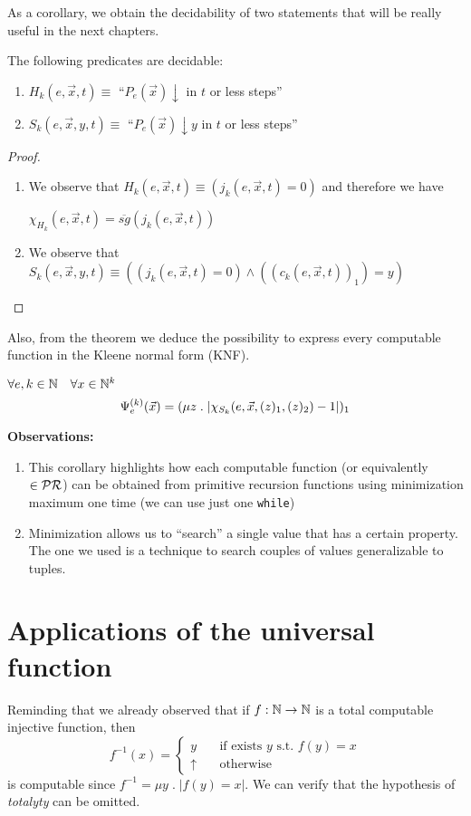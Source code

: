 As a corollary, we obtain the decidability of two statements that will
be really useful in the next chapters.

\begin{corollary}
  The following predicates are decidable:
  \begin{enumerate}[label=(\alph*)]
  \item $H_k(e, \vec{x}, t) \equiv$ ``$P_e(\vec{x})\downarrow$ in $t$
    or less steps''
  \item $S_k(e, \vec{x}, y, t) \equiv$ ``$P_e(\vec{x})\downarrow y$ in
    $t$ or less steps''
  \end{enumerate}
  \begin{proof}
    \begin{enumerate}[label=(\alph*)]
    \item We observe that
      $H_k(e, \vec{x}, t) \equiv (j_k(e,\vec{x}, t) = 0)$ and therefore
      we have

      $\chi_{H_k}(e, \vec{x}, t) = \overline{sg}(j_k(e,\vec{x},t))$
    \item We observe that
      $S_k(e, \vec{x}, y, t) \equiv ((j_k(e,\vec{x},t) = 0) \wedge ((c_k(e,\vec{x},t))_1)=y)$
    \end{enumerate}
  \end{proof}
\end{corollary}

Also, from the theorem we deduce the possibility to express every
computable function in the Kleene normal form (KNF).

\begin{corollary}
  $\forall e,k \in \mathbb{N} \quad \forall x \in \mathbb{N}^k$
  \[
    \Psi_e^{(k)} (\vec{x}) = (\mu z \;.\; |\chi_{S_k}(e, \vec{x}, (z)_1, (z)_2) - 1|)_1
  \]
\end{corollary}

\textbf{Observations:}
\begin{enumerate}[label=\roman*.]
\item This corollary highlights how each computable function (or
  equivalently $\in\mathcal{PR}$) can be obtained from primitive recursion
  functions using minimization maximum one time (we can use just one
  \texttt{while})
\item Minimization allows us to ``search'' a single value that has a
  certain property. The one we used is a technique to search couples
  of values generalizable to tuples.
\end{enumerate}

\section{Applications of the universal function}
Reminding that we already observed that if $f : \mathbb{N} \rightarrow \mathbb{N}$ is a total
computable injective function, then
\[
  f^{-1}(x) = \begin{cases}
    y & \quad \mbox{if exists $y$ s.t. } f(y) = x \\
    \uparrow & \quad \mbox{otherwise}
\end{cases}
\]
is computable since $f^{-1} = \mu y \; . \; |f(y) = x|$. We can verify
that the hypothesis of \emph{totalyty} can be omitted.

